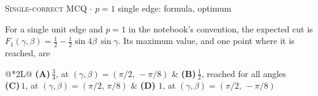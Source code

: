 \documentclass[11pt,a4paper]{article}
\newcommand{\optlabel}[1]{\textbf{(#1)}}
\newcommand{\correctlabel}[1]{\textcolor{okgreen}{\textbf{(#1)}\,\ding{51}}}
\newenvironment{qitem}[1]{\begin{list}{}{\setlength{\leftmargin}{3.3em}\setlength{\labelwidth}{3.1em}%
  \setlength{\labelsep}{0.2em}\setlength{\topsep}{3pt}\setlength{\parsep}{3pt}}\item[\textbf{Q.#1}\hfill]}{\end{list}}
\newcommand{\qmeta}[2]{{\footnotesize\color{black!60}\textsc{#1} \;$\cdot$\; #2}\par}
\begin{document}
\begin{qitem}{47}
\qmeta{Single-correct MCQ}{$p = 1$ single edge: formula, optimum}
For a single unit edge and $p = 1$ in the notebook's convention, the expected cut is
$F_1(\gamma, \beta) = \tfrac12 - \tfrac12\sin4\beta\,\sin\gamma$. Its maximum value, and one point where it is reached, are
\par\smallskip\noindent\begin{tabularx}{\linewidth}{@{}*{2}{L}@{}}
\optlabel{A}\,$\tfrac34$, at $(\gamma, \beta) = (\pi/2,\, -\pi/8)$ & \optlabel{B}\,$\tfrac12$, reached for all angles \\[3pt]
\optlabel{C}\,$1$, at $(\gamma, \beta) = (\pi/2,\, \pi/8)$ & \correctlabel{D}\,$1$, at $(\gamma, \beta) = (\pi/2,\, -\pi/8)$
\end{tabularx}
\end{qitem}
\end{document}
